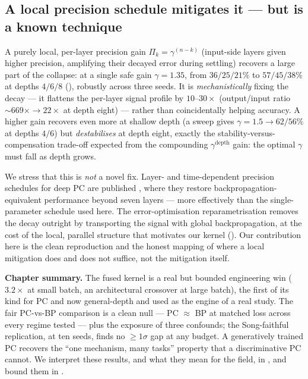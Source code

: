 \subsection{A local precision schedule mitigates it --- but is a known technique}
A purely local, per-layer precision gain $\Pi_k=\gamma^{(n-k)}$ (input-side layers given higher
precision, amplifying their decayed error during settling) recovers a large part of the collapse:
at a single safe gain $\gamma=1.35$, from $36/25/21\%$ to $57/45/38\%$ at depths $4/6/8$
(), robustly across three seeds. It is \emph{mechanistically} fixing the decay ---
it flattens the per-layer signal profile by $10$--$30\times$ (output/input ratio
$\sim\!669\times\to22\times$ at depth eight) --- rather than coincidentally helping accuracy. A
higher gain recovers even more at shallow depth (a sweep gives $\gamma=1.5\to62/56\%$ at depths
$4/6$) but \emph{destabilises} at depth eight, exactly the stability-versus-compensation trade-off
expected from the compounding $\gamma^{\text{depth}}$ gain: the optimal $\gamma$ must fall as depth
grows.

We stress that this is \emph{not} a novel fix. Layer- and time-dependent precision schedules for deep
PC are published \citep{qi2025settling, innocenti2025mupc}, where they restore
backpropagation-equivalent performance beyond seven layers --- more effectively than the
single-parameter schedule used here. The error-optimisation reparametrisation
\citep{goemaere2025epc} removes the decay outright by transporting the signal with global
backpropagation, at the cost of the local, parallel structure that motivates our kernel
(). Our contribution here is the clean reproduction and the honest mapping of
where a local mitigation does and does not suffice, not the mitigation itself.

\bigskip

\noindent\textbf{Chapter summary.} The fused kernel is a real but bounded engineering win
(\(3.2\times\) at small batch, an architectural crossover at large batch), the first of its kind for
PC and now general-depth and used as the engine of a real study. The fair PC-vs-BP comparison is a
clean null --- PC \(\approx\) BP at matched loss across every regime tested --- plus the exposure of
three confounds; the Song-faithful replication, at ten seeds, finds no \(\ge1\sigma\) gap at any
budget. A generatively trained PC recovers the ``one mechanism, many tasks'' property that a
discriminative PC cannot. We interpret these results, and what they mean for the field, in
, and bound them in .
